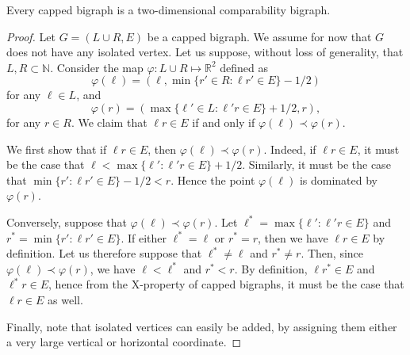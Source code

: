 \documentclass[10pt,a4paper]{amsart}
\begin{document}
\begin{lemma}
\label{lem:cappedcomparability}
    Every capped bigraph is a two-dimensional comparability bigraph. 
\end{lemma}

\begin{proof}
Let $G=(L\cup R,E)$ be a capped bigraph.
We assume for now that $G$ does not have any isolated vertex. 
Let us suppose, without loss of generality, that $L,R\subset\mathbb{N}$.
Consider the map $\varphi: L\cup R\mapsto\mathbb{R}^2$ defined as
\[
\varphi (\ell) = (\ell , \min \{r'\in R : \ell r'\in E\} - 1/2)
\]
for any $\ell\in L$, and
\[
\varphi (r) = (\max \{\ell'\in L : \ell'r\in E\} + 1/2, r),
\]
for any $r\in R$.
We claim that $\ell r\in E$ if and only if $\varphi (\ell)\prec \varphi(r)$.

We first show that if $\ell r\in E$, then $\varphi (\ell)\prec \varphi(r)$.
Indeed, if $\ell r\in E$, it must be the case that $\ell < \max \{\ell' : \ell' r\in E\} + 1/2$.
Similarly, it must be the case that $\min \{r' : \ell r'\in E\} - 1/2 < r$.
Hence the point $\varphi (\ell)$ is dominated by $\varphi(r)$.

Conversely, suppose that $\varphi (\ell)\prec \varphi(r)$.
Let $\ell^* = \max \{\ell' : \ell' r\in E\}$ and $r^* = \min \{r' : \ell r'\in E\}$.
If either $\ell^*=\ell$ or $r^*=r$, then we have $\ell r\in E$ by definition.
Let us therefore suppose that $\ell^*\not= \ell$ and $r^*\not= r$. 
Then, since $\varphi (\ell)\prec\varphi(r)$, we have $\ell < \ell^*$ and $r^* < r$. By definition, $\ell r^*\in E$ and $\ell^* r\in E$,
hence from the X-property of capped bigraphs, it must be the case that $\ell r\in E$ as well.

Finally, note that isolated vertices can easily be added, by assigning them either a very large vertical or horizontal coordinate. 
\end{proof}
\end{document}

